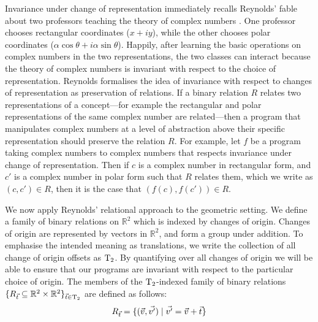 Invariance under change of representation immediately recalls
Reynolds' fable about two professors teaching the theory of complex
numbers \cite{reynolds83types}. One professor chooses rectangular
coordinates ($x + iy$), while the other chooses polar coordinates
($\alpha\cos\theta + i\alpha\sin\theta$). Happily, after learning the
basic operations on complex numbers in the two representations, the
two classes can interact because the theory of complex numbers is
invariant with respect to the choice of representation. Reynolds
formalises the idea of invariance with respect to changes of
representation as preservation of relations. If a binary relation $R$
relates two representations of a concept---for example the rectangular
and polar representations of the same complex number are
related---then a program that manipulates complex numbers at a level
of abstraction above their specific representation should preserve the
relation $R$. For example, let $f$ be a program taking complex numbers
to complex numbers that respects invariance under change of
representation. Then if $c$ is a complex number in rectangular form,
and $c'$ is a complex number in polar form such that $R$ relates them,
which we write as $(c,c') \in R$, then it is the case that $(f(c),
f(c')) \in R$.

We now apply Reynolds' relational approach to the geometric
setting. We define a family of binary relations on $\mathbb{R}^2$
which is indexed by changes of origin. Changes of origin are
represented by vectors in $\mathbb{R}^2$, and form a group under
addition. To emphasise the intended meaning as translations, we write
the collection of all change of origin offsets as $\mathrm{T}_2$. By
quantifying over all changes of origin we will be able to ensure that
our programs are invariant with respect to the particular choice of
origin. The members of the $\mathrm{T}_2$-indexed family of binary
relations $\{ R_{\vec{t}} \subseteq \mathbb{R}^2 \times \mathbb{R}^2
\}_{\vec{t} \in \mathrm{T}_2}$ are defined as follows:
\begin{displaymath}
  R_{\vec{t}} = \{ (\vec{v}, \vec{v'}) \mathrel| \vec{v'} = \vec{v} + \vec{t} \}
\end{displaymath}

